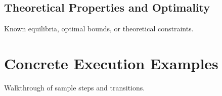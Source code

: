 \documentclass[11pt,a4paper]{article}
\begin{document}
\subsection{Theoretical Properties and Optimality}
Known equilibria, optimal bounds, or theoretical constraints.


\section{Concrete Execution Examples}

Walkthrough of sample steps and transitions.
\end{document}
